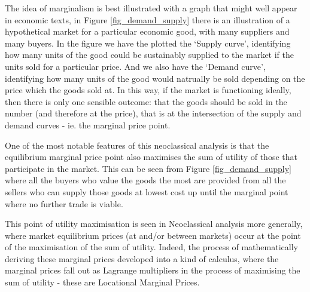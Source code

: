 \documentclass[
10pt, %
a4paper, %
oneside, %
headinclude,footinclude, %
BCOR5mm, %
]{scrartcl}
\begin{document}
The idea of marginalism is best illustrated with a graph that might well appear in economic texts, in Figure \ref{fig_demand_supply} there is an illustration of a hypothetical market for a particular economic good, with many suppliers and many buyers.
In the figure we have the plotted the `Supply curve', identifying how many units of the good could be sustainably supplied to the market if the units sold for a particular price.
And we also have the `Demand curve', identifying how many units of the good would natrually be sold depending on the price which the goods sold at.
In this way, if the market is functioning ideally, then there is only one sensible outcome: that the goods should be sold in the number (and therefore at the price), that is at the intersection of the supply and demand curves - ie. the marginal price point.

One of the most notable features of this neoclassical analysis is that the equilibrium marginal price point also maximises the sum of utility of those that participate in the market.
This can be seen from Figure \ref{fig_demand_supply} where all the buyers who value the goods the most are provided from all the sellers who can supply those goods at lowest cost up until the marginal point where no further trade is viable.

This point of utility maximisation is seen in Neoclassical analysis more generally, where market equilibrium prices (at and/or between markets) occur at the point of the maximisation of the sum of utility. Indeed, the process of mathematically deriving these marginal prices developed into a kind of calculus, where the marginal prices fall out as Lagrange multipliers in the process of maximising the sum of utility - these are Locational Marginal Prices.
\end{document}
